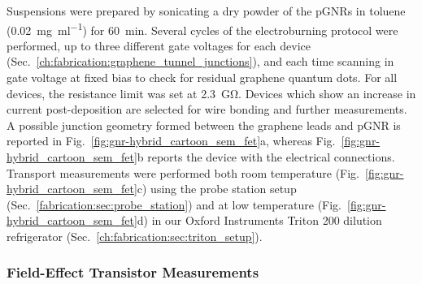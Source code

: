 Suspensions were prepared by sonicating a dry powder of the \glspl{pGNR} in toluene (\SI{0.02}{\milli\gram\per\milli\litre}) for \SI{60}{\minute}. Several cycles of the electroburning protocol were performed, up to three different gate voltages for each device (Sec.~\ref{ch:fabrication:graphene_tunnel_junctions}), and each time scanning in gate voltage at fixed bias to check for residual graphene quantum dots. For all devices, the resistance limit was set at \SI{2.3}{\giga\ohm}. Devices which show an increase in current post-deposition are selected for wire bonding and further measurements. A possible junction geometry formed between the graphene leads and \gls{pGNR} is reported in Fig.~\ref{fig:gnr-hybrid_cartoon_sem_fet}a, whereas Fig.~\ref{fig:gnr-hybrid_cartoon_sem_fet}b reports the device with the electrical connections. Transport measurements were performed both room temperature (Fig.~\ref{fig:gnr-hybrid_cartoon_sem_fet}c) using the probe station setup (Sec.~\ref{fabrication:sec:probe_station}) and at low temperature (Fig.~\ref{fig:gnr-hybrid_cartoon_sem_fet}d) in our Oxford Instruments Triton 200 dilution refrigerator (Sec.~\ref{ch:fabrication:sec:triton_setup}).

\subsubsection{Field-Effect Transistor Measurements}

